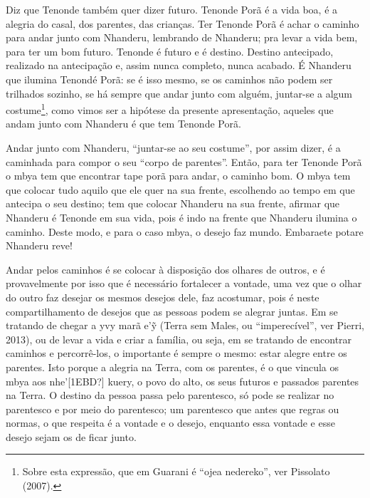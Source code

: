 \documentclass{article}
\begin{document}
Diz que Tenonde tamb\'em quer dizer futuro. Tenonde Por\~a \'e a vida
boa, \'e a alegria do casal, dos parentes, das crian\c{c}as. Ter
Tenonde Por\~a \'e achar o caminho para andar junto com Nhanderu,
lembrando de Nhanderu; pra levar a vida bem, para ter um bom futuro.
Tenonde \'e futuro e \'e destino. Destino antecipado, realizado na
antecipa\c{c}\~ao e, assim nunca completo, nunca acabado. \'E Nhanderu
que ilumina Tenond\'e Por\~a: se \'e isso mesmo, se os caminhos n\~ao
podem ser trilhados sozinho, se h\'a sempre que andar junto com
algu\'em, juntar-se a algum costume\footnote{ Sobre esta express\~ao,
que em Guarani \'e {\textquotedblleft}ojea
nedereko{\textquotedblright}, ver Pissolato (2007). }, como vimos ser a
hip\'otese da presente apresenta\c{c}\~ao, aqueles que andam junto com
Nhanderu \'e que tem Tenonde Por\~a.

Andar junto com Nhanderu, {\textquotedblleft}juntar-se ao seu
costume{\textquotedblright}, por assim dizer, \'e a caminhada para
compor o seu {\textquotedblleft}corpo de parentes{\textquotedblright}.
Ent\~ao, para ter Tenonde Por\~a o mbya tem que encontrar tape por\~a
para andar, o caminho bom. O mbya tem que colocar tudo aquilo que ele
quer na sua frente, escolhendo ao tempo em que antecipa o seu destino;
tem que colocar Nhanderu na sua frente, afirmar que Nhanderu \'e
Tenonde em sua vida, pois \'e indo na frente que Nhanderu ilumina o
caminho. Deste modo, e para o caso mbya, o desejo faz mundo. Embaraete
potare Nhanderu reve!

Andar pelos caminhos \'e se colocar \`a disposi\c{c}\~ao dos olhares de
outros, e \'e provavelmente por isso que \'e necess\'ario fortalecer a
vontade, uma vez que o olhar do outro faz desejar os mesmos desejos
dele, faz acostumar, pois \'e neste compartilhamento de desejos que as
pessoas podem se alegrar juntas. Em se tratando de chegar a yvy mar\~a
e{\textquoteright}\~{y} (Terra sem Males, ou
{\textquotedblleft}imperec\'ivel{\textquotedblright}, ver Pierri,
2013), ou de levar a vida e criar a fam\'ilia, ou seja, em se tratando
de encontrar caminhos e percorr\^e-los, o importante \'e sempre o
mesmo: estar alegre entre os parentes. Isto porque a alegria na Terra,
com os parentes, \'e o que vincula os mbya aos
nhe{\textquoteright}[1EBD?] kuery, o povo do alto, os seus futuros e
passados parentes na Terra. O destino da pessoa passa pelo parentesco,
s\'o pode se realizar no parentesco e por meio do parentesco; um
parentesco que antes que regras ou normas, o que respeita \'e a vontade
e o desejo, enquanto essa vontade e esse desejo sejam os de ficar
junto. 
\end{document}
